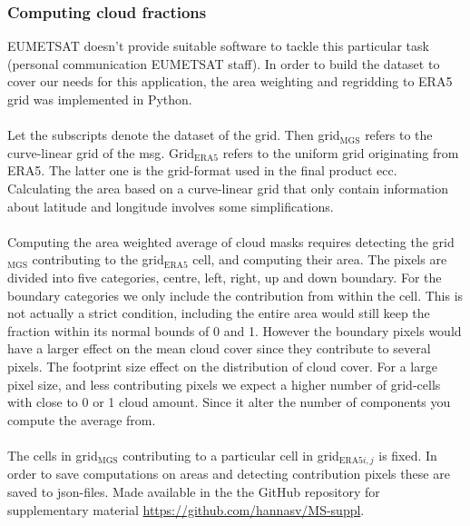 \subsubsection{Computing cloud fractions} \label{sec:remapping}
EUMETSAT doesn't provide suitable software to tackle this particular task (personal communication EUMETSAT staff). In order to build the dataset to cover our needs for this application, the area weighting and regridding to ERA5 grid was implemented in Python.
\\ \\ 
Let the subscripts denote the dataset of the grid. Then grid$_{\text{MGS}}$ refers to the curve-linear grid of the \acrlong{msg}. Grid$_{\text{ERA5}}$ refers to the uniform grid originating from ERA5. The latter one is the grid-format used in the final product \acrlong{ecc}. Calculating the area based on a curve-linear grid that only contain information about latitude and longitude involves some simplifications.
\\ \\ 
Computing the area weighted average of cloud masks requires detecting the grid$_{\text{MGS}}$ contributing to the grid$_{\text{ERA5}}$ cell, and computing their area. The pixels are divided into five categories, centre, left, right, up and down boundary. 
For the boundary categories we only include the contribution from within the cell. This is not actually a strict condition, including the entire area would still keep the fraction within its normal bounds of 0 and 1. However the boundary pixels would have a larger effect on the mean cloud cover since they contribute to several pixels. The footprint size effect on the distribution of cloud cover. For a large pixel size, and less contributing pixels we expect a higher number of grid-cells with close to 0 or 1 cloud amount. Since it alter the number of components you compute the average from.
\\ \\
The cells in grid$_{\text{MGS}}$ contributing to a particular cell in grid$_{\text{ERA5}i,j}$ is fixed. In order to save computations on areas and detecting contribution pixels these are saved to \acrshort{json}-files. Made available in the the GitHub repository for supplementary material \href{https://github.com/hannasv/MS-suppl}{https://github.com/hannasv/MS-suppl}.
